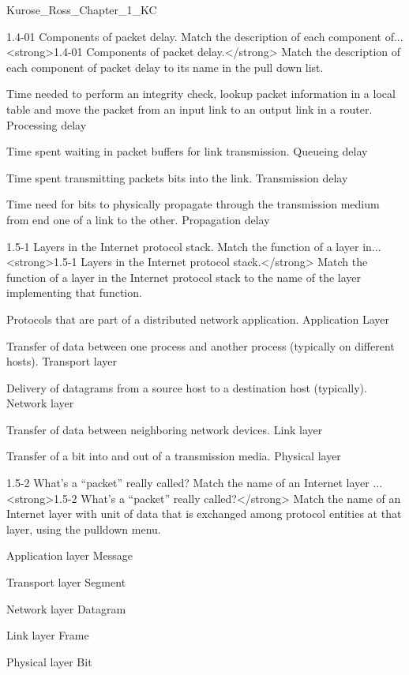 \documentclass[a4paper,twocolumn]{article}
\begin{document}
\begin{quiz}{Kurose_Ross_Chapter_1_KC}
\begin{matching}[
	points=1,
	penalty=0.33333,
]{1.4-01 Components of packet delay. Match the description of each component of...}
<strong>1.4-01 Components of packet delay.</strong> Match the description of each component of packet delay to its name in the pull down list.
\item Time needed to perform an integrity check, lookup packet information in a local table and move the packet from an input link to an output link in a router. \answer Processing delay
\item Time spent waiting in packet buffers for link transmission. \answer Queueing delay
\item Time spent transmitting packets bits into the link. \answer Transmission delay
\item Time need for bits to physically propagate through the transmission medium from end one of a link to the other. \answer Propagation delay
\end{matching}

\begin{matching}[
	points=1,
	penalty=0.33333,
]{1.5-1 Layers in the Internet protocol stack. Match the function of a layer in...}
<strong>1.5-1 Layers in the Internet protocol stack.</strong> Match the function of a layer in the Internet protocol stack to the name of the layer implementing that function.
\item Protocols that are part of a distributed network application. \answer Application Layer
\item Transfer of data between one process and another process (typically on different hosts). \answer Transport layer
\item Delivery of datagrams from a source host to a destination host (typically). \answer Network layer
\item Transfer of data between neighboring network devices. \answer Link layer
\item Transfer of a bit into and out of a transmission media. \answer Physical layer
\end{matching}

\begin{matching}[
	points=1,
	penalty=0.33333,
]{1.5-2 What’s a “packet” really called? Match the name of an Internet layer ...}
<strong>1.5-2 What’s a “packet” really called?</strong> Match the name of an Internet layer with unit of data that is exchanged among protocol entities at that layer, using the pulldown menu.
\item Application layer \answer Message
\item Transport layer \answer Segment
\item Network layer \answer Datagram
\item Link layer \answer Frame
\item Physical layer \answer Bit
\end{matching}


\end{quiz}
\end{document}
